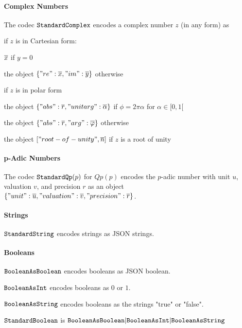 \paragraph{Complex Numbers}
The codec $\cn{StandardComplex}$ encodes a complex number $z$ (in any form) as
\begin{compactitem}
 \item if $z$ is in Cartesian form:
  \begin{compactitem}
    \item $\ov{x}$ if $y=0$
    \item the object $\jobj{"re": \ov{x}, "im":\ov{y}}$ otherwise
  \end{compactitem}
 \item if $z$ is in polar form
  \begin{compactitem}
   \item the object $\jobj{"abs": \ov{r}, "unitarg": \ov{\alpha}}$ if $\phi=2\pi \alpha$ for $\alpha\in[0,1[$
   \item the object $\jobj{"abs": \ov{r}, "arg": \ov{\phi}}$ otherwise
  \end{compactitem}
 \item the object $["root-of-unity", \ov{n}]$ if $z$ is a root of unity
\end{compactitem}

\paragraph{p-Adic Numbers}
The codec $\cn{StandardQp}(p)$ for $Qp(p)$ encodes the $p$-adic number with unit $u$, valuation $v$, and precision $r$ as an object $\jobj{"unit":\ov{u},"valuation":\ov{v},"precision":\ov{r}}$.

\paragraph{Strings}
$\cn{StandardString}$ encodes strings as JSON strings.

\paragraph{Booleans}
$\cn{BooleanAsBoolean}$ encodes booleans as JSON boolean.

$\cn{BooleanAsInt}$ encodes booleans as $0$ or $1$.

$\cn{BooleanAsString}$ encodes booleans as the strings "true" or "false".

$\cn{StandardBoolean}$ is $\cunion{\cn{BooleanAsBoolean},\cn{BooleanAsInt},\cn{BooleanAsString}}$

